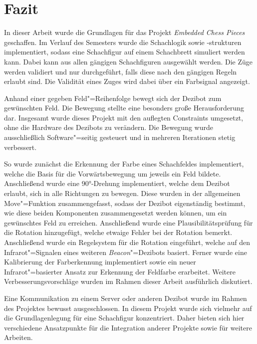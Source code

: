 
\section{Fazit}
\label{sec:conclusion}

In dieser Arbeit wurde die Grundlagen für das Projekt \emph{Embedded Chess Pieces} geschaffen. Im Verlauf des Semesters wurde die Schachlogik sowie -strukturen implementiert, sodass eine Schachfigur auf einem Schachbrett simuliert werden kann. Dabei kann aus allen gängigen Schachfiguren ausgewählt werden. Die Züge werden validiert und nur durchgeführt, falls diese nach den gängigen Regeln~\cite{justUSChessFederations2019} erlaubt sind. Die Validität eines Zuges wird dabei über ein Farbsignal angezeigt.

Anhand einer gegeben Feld"=Reihenfolge bewegt sich der Dezibot zum gewünschten Feld. Die Bewegung stellte eine besonders große Herausforderung dar. Insgesamt wurde dieses Projekt mit den auflegten Constraints umgesetzt, ohne die Hardware des Dezibots zu verändern. Die Bewegung wurde ausschließlich Software"=seitig gesteuert und in mehreren Iterationen stetig verbessert.

So wurde zunächst die Erkennung der Farbe eines Schachfeldes implementiert, welche die Basis für die Vorwärtsbewegung um jeweils ein Feld bildete. Anschließend wurde eine 90°-Drehung implementiert, welche dem Dezibot erlaubt, sich in alle Richtungen zu bewegen. Diese wurden in der allgemeinen Move"=Funktion zusammengefasst, sodass der Dezibot eigenständig bestimmt, wie diese beiden Komponenten zusammengesetzt werden können, um ein gewünschtes Feld zu erreichen. Anschließend wurde eine Plausibilitätsprüfung für die Rotation hinzugefügt, welche etwaige Fehler bei der Rotation bemerkt. Anschließend wurde ein Regelsystem für die Rotation eingeführt, welche auf den Infrarot"=Signalen eines weiteren \emph{Beacon}"=Dezibots basiert. Ferner wurde eine Kalibrierung der Farberkennung implementiert sowie ein neuer Infrarot"=basierter Ansatz zur Erkennung der Feldfarbe erarbeitet. Weitere Verbesserungsvorschläge wurden im Rahmen dieser Arbeit ausführlich diskutiert.

Eine Kommunikation zu einem Server oder anderen Dezibot wurde im Rahmen des Projektes bewusst ausgeschlossen. In diesem Projekt wurde sich vielmehr auf die Grundlagenlegung für eine Schachfigur konzentriert. Daher bieten sich hier verschiedene Ansatzpunkte für die Integration anderer Projekte sowie für weitere Arbeiten.

